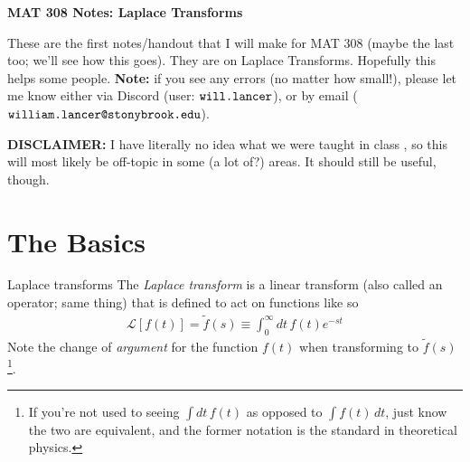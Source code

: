 \documentclass[11pt]{article}
\newcommand{\bigtitle}[1]{
    \begin{center}
    \huge \textbf{#1}
    \end{center}
}
\theoremstyle{mystyle}
\begin{document}
\bigtitle{MAT 308 Notes: Laplace Transforms}

\noin
These are the first notes/handout that I will make for
MAT 308 (maybe the last too; we'll see how this goes).
They are on Laplace Transforms. Hopefully this helps
some people.
\textbf{Note:} if you see any errors (no
matter how small!), please let me know either via Discord
(user: $\verb|will.lancer|$), or by email ($\verb|william.lancer@stonybrook.edu|$).

\noin
\textbf{DISCLAIMER:} I have literally no idea what we
were taught in class \skully, so this will most likely be off-topic
in some (a lot of?) areas. It should still be useful, though.

\section{The Basics}

\begin{psidea}{Laplace transforms}{}
    The \emph{Laplace transform} is a linear transform (also
    called an operator; same thing)
    that is defined to act on functions like so
    \begin{align*}
        \mathcal{L}[f(t)] = \tilde{f}(s) \equiv \int_0^\infty dt \, f(t) e^{-st}
    \end{align*}
    Note the change of \emph{argument} for the function $f(t)$
    when transforming to $\tilde{f}(s)$\footnote{If you're
    not used to seeing $\int dt \, f(t)$ as opposed
    to $\int f(t) \, dt$, just know the two are equivalent,
    and the former notation is the standard in theoretical
    physics.}.
\end{psidea}
\end{document}
